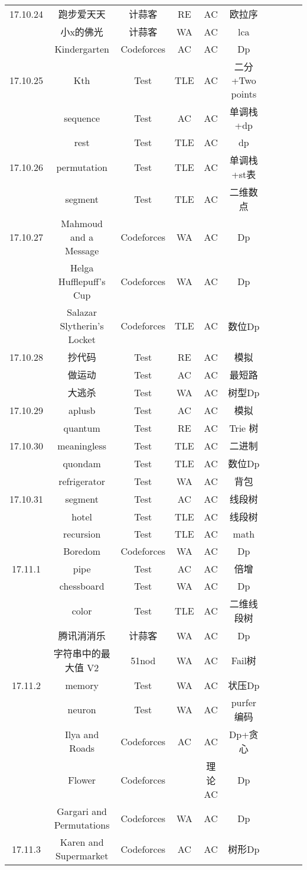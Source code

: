 \documentclass[landscape]{article}
\begin{document}
\begin{longtable}{cccccccccc}
  \hline
  17.10.24 &跑步爱天天& 计蒜客 &RE &AC& 欧拉序\\
  &小x的佛光 &计蒜客 &WA &AC& lca\\
  & Kindergarten &Codeforces& AC& AC &Dp\\
  \hline
  17.10.25 &Kth& Test& TLE& AC& 二分+Two points\\
  &sequence& Test& AC &AC &单调栈+dp\\
  &rest& Test &TLE &AC &dp\\
  \hline
  17.10.26 &permutation &Test &TLE &AC& 单调栈+st表\\
  &segment &Test &TLE &AC& 二维数点\\
  \hline
  17.10.27 &Mahmoud and a Message &Codeforces &WA &AC &Dp\\
  &Helga Hufflepuff’s Cup &Codeforces& WA& AC &Dp\\
  &Salazar Slytherin’s Locket &Codeforces &TLE& AC& 数位Dp\\
  \hline
  17.10.28 &抄代码 &Test& RE &AC &模拟\\
  &做运动 &Test &AC& AC& 最短路\\
  &大逃杀 &Test& WA& AC &树型Dp\\
  \hline
  17.10.29 &aplusb &Test &AC& AC& 模拟\\
  &quantum &Test& RE &AC &Trie 树\\
  \hline
  17.10.30 & meaningless & Test & TLE & AC & 二进制\\
  & quondam & Test & TLE & AC & 数位Dp\\
  & refrigerator & Test & WA & AC & 背包\\
  \hline
  17.10.31 & segment & Test & AC & AC & 线段树\\
  & hotel & Test & TLE & AC & 线段树\\
  & recursion & Test & TLE & AC & math\\
  & Boredom & Codeforces & WA & AC & Dp\\
  \hline
  17.11.1 & pipe & Test & AC & AC & 倍增\\
  & chessboard & Test & WA & AC & Dp\\
  & color & Test  & TLE & AC & 二维线段树\\
  & 腾讯消消乐 & 计蒜客 & WA & AC & Dp\\
  & 字符串中的最大值 V2 & 51nod & WA & AC & Fail树\\
  \hline
  17.11.2 & memory & Test & WA & AC & 状压Dp\\
  & neuron & Test & WA & AC & purfer编码\\
  & Ilya and Roads  & Codeforces & AC & AC & Dp+贪心\\
  & Flower & Codeforces & & 理论AC & Dp\\
  & Gargari and Permutations & Codeforces & WA & AC & Dp\\
  \hline
  17.11.3 & Karen and Supermarket & Codeforces & AC & AC & 树形Dp\\
  
\end{longtable}
\end{document}

